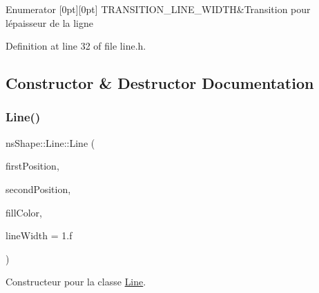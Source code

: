 \begin{DoxyEnumFields}{Enumerator}
[0pt][0pt]{}\mbox{\label{classns_shape_1_1_line_a446a1bbc370b3426afe05f22b681ea58a58ffbb046bb10ae9ed84a672d9daea03}} 
T\+R\+A\+N\+S\+I\+T\+I\+O\+N\+\_\+\+L\+I\+N\+E\+\_\+\+W\+I\+D\+TH&Transition pour l\textquotesingle{}épaisseur de la ligne \\
\hline

\end{DoxyEnumFields}


Definition at line 32 of file line.\+h.



\subsection{Constructor \& Destructor Documentation}
\mbox{\label{classns_shape_1_1_line_a7e565c06c16396c7dba0f9d9beedcd17}} 
\subsubsection{\texorpdfstring{Line()}{Line()}}
{\footnotesize\ttfamily ns\+Shape\+::\+Line\+::\+Line (\begin{DoxyParamCaption}\item[{const \hyperlink{classns_graphics_1_1_vec2_d}{ns\+Graphics\+::\+Vec2D} \&}]{first\+Position,  }\item[{const \hyperlink{classns_graphics_1_1_vec2_d}{ns\+Graphics\+::\+Vec2D} \&}]{second\+Position,  }\item[{const \hyperlink{classns_graphics_1_1_r_g_b_acolor}{ns\+Graphics\+::\+R\+G\+B\+Acolor} \&}]{fill\+Color,  }\item[{const float \&}]{line\+Width = {\ttfamily 1.f} }\end{DoxyParamCaption})}



Constructeur pour la classe \hyperlink{classns_shape_1_1_line}{Line}. 


